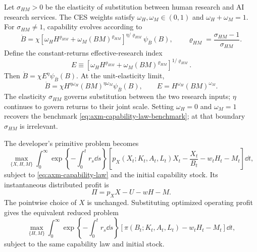 Let \(\sigma_{HM}>0\) be the elasticity of substitution between human research
and AI research services. The CES weights satisfy
\(\omega_H,\omega_M\in(0,1)\) and \(\omega_H+\omega_M=1\). For
\(\sigma_{HM}\neq1\), capability evolves according to
\begin{equation}
 \dot B=\chi
 \left[\omega_H H^{\varrho_{HM}}
 +\omega_M(BM)^{\varrho_{HM}}\right]^{\eta/\varrho_{HM}}
 \psi_{\overline B}(B),
 \qquad
 \varrho_{HM}=\frac{\sigma_{HM}-1}{\sigma_{HM}}.
 \label{eq:axm-capability-law}
\end{equation}
Define the constant-returns effective-research index
\begin{equation}
 E\equiv\left[\omega_H H^{\varrho_{HM}}
 +\omega_M(BM)^{\varrho_{HM}}\right]^{1/\varrho_{HM}}.
 \label{eq:axm-effective-research}
\end{equation}
Then \(\dot B=\chi E^\eta\psi_{\overline B}(B)\). At the unit-elasticity limit,
\begin{equation}
 \dot B=\chi H^{\eta\omega_H}(BM)^{\eta\omega_M}
 \psi_{\overline B}(B),
 \qquad E=H^{\omega_H}(BM)^{\omega_M}.
 \label{eq:axm-capability-law-cd}
\end{equation}
The elasticity \(\sigma_{HM}\) governs substitution between the two research
inputs; \(\eta\) continues to govern returns to their joint scale. Setting
\(\omega_H=0\) and \(\omega_M=1\) recovers the benchmark
\eqref{eq:axm-capability-law-benchmark}; at that boundary
\(\sigma_{HM}\) is irrelevant.

The developer's primitive problem becomes
\begin{equation}
 \max_{\{X,H,M\}}
 \int_0^\infty
 \exp\left\{-\int_0^t r_s\dd s\right\}
 \left[p_X(X_t;K_t,A_t,L_t)X_t-\frac{X_t}{B_t}-w_tH_t-M_t\right]\dd t,
 \label{eq:axm-developer-problem}
\end{equation}
subject to \eqref{eq:axm-capability-law} and the initial capability stock. Its
instantaneous distributed profit is
\begin{equation}
 \Pi=p_XX-U-wH-M.
 \label{eq:axm-developer-profit}
\end{equation}
The pointwise choice of \(X\) is unchanged. Substituting optimized operating
profit gives the equivalent reduced problem
\begin{equation}
 \max_{\{H,M\}}
 \int_0^\infty
 \exp\left\{-\int_0^t r_s\dd s\right\}
 \left[\pi(B_t;K_t,A_t,L_t)-w_tH_t-M_t\right]\dd t,
 \label{eq:axm-developer-problem-reduced}
\end{equation}
subject to the same capability law and initial stock.

